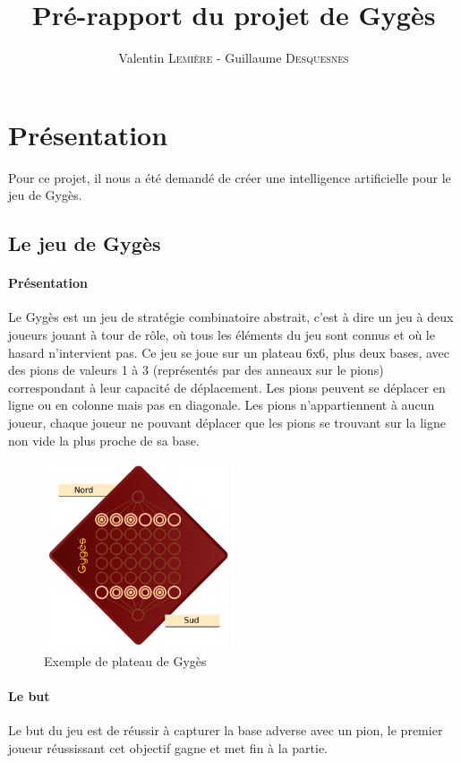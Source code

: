 \documentclass[a4paper]{article}
\title{Pré-rapport du projet de Gygès}
\author{Valentin \textsc{Lemière} - Guillaume \textsc{Desquesnes}}
\date{}
\begin{document}
\maketitle

\section{Présentation}

	Pour ce projet, il nous a été demandé de créer une intelligence artificielle
	pour le jeu de Gygès.

	\subsection{Le jeu de Gygès}
		\paragraph{Présentation} Le Gygès est un jeu de stratégie combinatoire abstrait, c'est à dire un jeu
		à deux joueurs jouant à tour de rôle, où tous les éléments du jeu sont connus et où le hasard n'intervient
		pas. Ce jeu se joue sur un plateau 6x6, plus deux bases, avec des pions de valeurs 1 à 3 (représentés par
		des anneaux sur le pions) correspondant à leur capacité de déplacement. Les pions peuvent se déplacer en ligne
		ou en colonne mais pas en diagonale. Les pions n'appartiennent à aucun joueur, chaque joueur ne pouvant
		déplacer que les pions se trouvant sur la ligne non vide la plus proche de sa base.

		\begin{figure}[h]
			\centering
			\includegraphics[width=0.5\textwidth]{Gyges.png}
			\caption{Exemple de plateau de Gygès}
			\label{fig:plateau_de_gyges}
		\end{figure}


		\paragraph{Le but} Le but du jeu est de réussir à capturer la base adverse avec un pion,
		le premier joueur réussissant cet objectif gagne et met fin à la partie.
\end{document}
